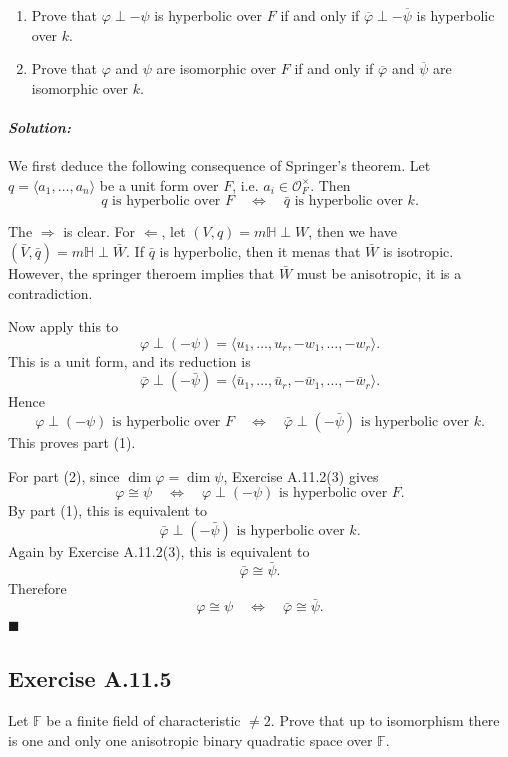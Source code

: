 \documentclass[12pt, a4paper]{article}
\newenvironment{solution}
  {\paragraph{\textit{Solution:}}\par\medskip}
  {\hfill$\blacksquare$\vspace{0.1cm}}
\begin{document}
\begin{enumerate}
    \item Prove that $\varphi\perp -\psi$ is hyperbolic over $F$ if and only if $\overline{\varphi}\perp -\overline{\psi}$ is hyperbolic over $k$.

    \item Prove that $\varphi$ and $\psi$ are isomorphic over $F$ if and only if $\overline{\varphi}$ and $\overline{\psi}$ are isomorphic over $k$.
\end{enumerate}
\begin{solution}
    We first deduce the following consequence of Springer's theorem. Let
\(q=\langle a_1,\dots,a_n\rangle\) be a unit form over \(F\), i.e.
\(a_i\in\mathcal O_F^\times\). Then
\[
q \text{ is hyperbolic over }F
\quad\Longleftrightarrow\quad
\bar q \text{ is hyperbolic over }k.
\]

The $\Rightarrow$ is clear. For $\Leftarrow$, let $(V,q) = m\mathbb{H}\perp W$, then we have $(\bar{V},\bar{q})= m\mathbb{H}\perp \bar{W}$. If $\bar{q}$ is hyperbolic, then 
it menas that $\bar{W}$ is isotropic. However, the springer theroem implies that $\bar{W}$ must be anisotropic, it is a contradiction.


Now apply this to
\[
\varphi\perp(-\psi)
=
\langle u_1,\dots,u_r,-w_1,\dots,-w_r\rangle .
\]
This is a unit form, and its reduction is
\[
\bar\varphi\perp(-\bar\psi)
=
\langle \bar u_1,\dots,\bar u_r,-\bar w_1,\dots,-\bar w_r\rangle .
\]
Hence
\[
\varphi\perp(-\psi)\text{ is hyperbolic over }F
\quad\Longleftrightarrow\quad
\bar\varphi\perp(-\bar\psi)\text{ is hyperbolic over }k.
\]
This proves part (1).

For part (2), since \(\dim\varphi=\dim\psi\), Exercise A.11.2(3) gives
\[
\varphi\cong\psi
\quad\Longleftrightarrow\quad
\varphi\perp(-\psi)\text{ is hyperbolic over }F.
\]
By part (1), this is equivalent to
\[
\bar\varphi\perp(-\bar\psi)\text{ is hyperbolic over }k.
\]
Again by Exercise A.11.2(3), this is equivalent to
\[
\bar\varphi\cong\bar\psi.
\]
Therefore
\[
\varphi\cong\psi
\quad\Longleftrightarrow\quad
\bar\varphi\cong\bar\psi .
\]
\end{solution}



\subsection*{Exercise A.11.5}

Let $\mathbb{F}$ be a finite field of characteristic $\neq 2$. Prove that up to isomorphism there is one and only one anisotropic binary quadratic space over $\mathbb{F}$.
\end{document}
